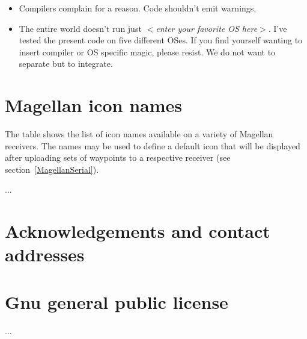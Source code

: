 \documentclass[12pt]{article}
\begin{document}
\begin{appendix}
\begin{itemize}
\item Compilers complain for a reason. Code shouldn't emit warnings.

\item The entire world doesn't run just {\em $<$enter your favorite OS here$>$}. I've tested the present code on
five different OSes. If you find yourself wanting to insert compiler or
OS specific magic, please resist. We do not want to separate but to integrate.

\end{itemize}


\section{Magellan icon names}
\label{MagellanDefIcons}

The table shows the list of icon names available on a variety of Magellan receivers. The names may be used to define a default icon that will be displayed after uploading sets of waypoints to a respective receiver (see section~\ref{MagellanSerial}).

...


\section{Acknowledgements and contact addresses}



\section{Gnu general public license}
\label{GPL}

...

\end{appendix}
%
%
\end{document}
